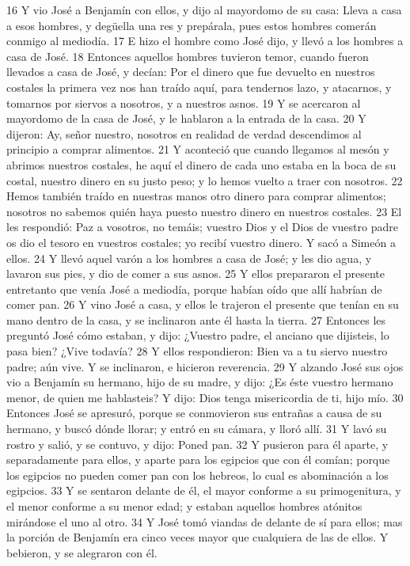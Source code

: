 16 Y vio José a Benjamín con ellos, y dijo al mayordomo de su casa: Lleva a casa a esos hombres, y degüella una res y prepárala, pues estos hombres comerán conmigo al mediodía.
17 E hizo el hombre como José dijo, y llevó a los hombres a casa de José.
18 Entonces aquellos hombres tuvieron temor, cuando fueron llevados a casa de José, y decían: Por el dinero que fue devuelto en nuestros costales la primera vez nos han traído aquí, para tendernos lazo, y atacarnos, y tomarnos por siervos a nosotros, y a nuestros asnos.
19 Y se acercaron al mayordomo de la casa de José, y le hablaron a la entrada de la casa.
20 Y dijeron: Ay, señor nuestro, nosotros en realidad de verdad descendimos al principio a comprar alimentos.
21 Y aconteció que cuando llegamos al mesón y abrimos nuestros costales, he aquí el dinero de cada uno estaba en la boca de su costal, nuestro dinero en su justo peso; y lo hemos vuelto a traer con nosotros.
22 Hemos también traído en nuestras manos otro dinero para comprar alimentos; nosotros no sabemos quién haya puesto nuestro dinero en nuestros costales.
23 El les respondió: Paz a vosotros, no temáis; vuestro Dios y el Dios de vuestro padre os dio el tesoro en vuestros costales; yo recibí vuestro dinero. Y sacó a Simeón a ellos.
24 Y llevó aquel varón a los hombres a casa de José; y les dio agua, y lavaron sus pies, y dio de comer a sus asnos.
25 Y ellos prepararon el presente entretanto que venía José a mediodía, porque habían oído que allí habrían de comer pan.
26 Y vino José a casa, y ellos le trajeron el presente que tenían en su mano dentro de la casa, y se inclinaron ante él hasta la tierra.
27 Entonces les preguntó José cómo estaban, y dijo: ¿Vuestro padre, el anciano que dijisteis, lo pasa bien? ¿Vive todavía?
28 Y ellos respondieron: Bien va a tu siervo nuestro padre; aún vive. Y se inclinaron, e hicieron reverencia.
29 Y alzando José sus ojos vio a Benjamín su hermano, hijo de su madre, y dijo: ¿Es éste vuestro hermano menor, de quien me hablasteis? Y dijo: Dios tenga misericordia de ti, hijo mío.
30 Entonces José se apresuró, porque se conmovieron sus entrañas a causa de su hermano, y buscó dónde llorar; y entró en su cámara, y lloró allí.
31 Y lavó su rostro y salió, y se contuvo, y dijo: Poned pan.
32 Y pusieron para él aparte, y separadamente para ellos, y aparte para los egipcios que con él comían; porque los egipcios no pueden comer pan con los hebreos, lo cual es abominación a los egipcios.
33 Y se sentaron delante de él, el mayor conforme a su primogenitura, y el menor conforme a su menor edad; y estaban aquellos hombres atónitos mirándose el uno al otro.
34 Y José tomó viandas de delante de sí para ellos; mas la porción de Benjamín era cinco veces mayor que cualquiera de las de ellos. Y bebieron, y se alegraron con él.

